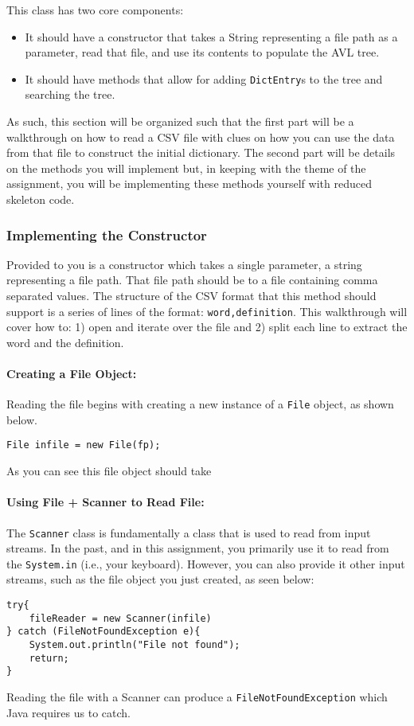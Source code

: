 \documentclass[a4paper]{article}
\begin{document}
This class has two core components:
\begin{itemize}
    \item It should have a constructor that takes a String representing a file path as a parameter, read that file, and use its contents to populate the AVL tree.
    \item It should have methods that allow for adding \lstinline|DictEntry|s to the tree and searching the tree.
\end{itemize}
As such, this section will be organized such that the first part will be a walkthrough
on how to read a CSV file with clues on how you can use the data from that file 
to construct the initial dictionary. The second part will be details on the methods you will
implement but, in keeping with the theme of the assignment, you will be implementing these 
methods yourself with reduced skeleton code.

\subsubsection{Implementing the Constructor}

Provided to you is a constructor which takes a single parameter, a string
representing a file path.  That file path should be to a file containing comma
separated values. The structure of the CSV format that this method should
support is a series of lines of the format: \texttt{word,definition}. This 
walkthrough will cover how to: 1) open and iterate over the file and 2) split
each line to extract the word and the definition. 

\paragraph{Creating a File Object: } Reading the file begins with creating a
new instance of a \lstinline|File| object, as shown below.
\begin{lstlisting}[frame=trBL]
File infile = new File(fp);
\end{lstlisting}
As you can see this file object should take 

\paragraph{Using File + Scanner to Read File: } The \lstinline|Scanner| 
class is fundamentally a class that is used to read from  input streams. In the
past, and in this assignment, you primarily use it to read from the
\lstinline|System.in| (i.e., your keyboard). However, you can also provide it 
other input streams, such as the file object you just created, as seen below:
\begin{lstlisting}[frame=trBL]
try{
    fileReader = new Scanner(infile)
} catch (FileNotFoundException e){
    System.out.println("File not found");
    return;
}
\end{lstlisting}
Reading the file with a Scanner can produce a \lstinline|FileNotFoundException|
which Java requires us to catch.
\end{document}
